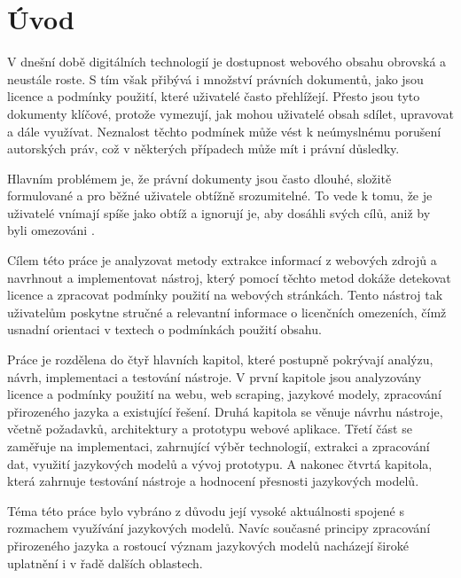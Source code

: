 \chapter*{Úvod}

V dnešní době digitálních technologií je dostupnost webového obsahu obrovská a neustále roste.
S tím však přibývá i množství právních dokumentů, jako jsou licence a podmínky použití, které uživatelé často přehlížejí.
Přesto jsou tyto dokumenty klíčové, protože vymezují, jak mohou uživatelé obsah sdílet, upravovat a dále využívat.
Neznalost těchto podmínek může vést k neúmyslnému porušení autorských práv, což v některých případech může mít i právní důsledky.

Hlavním problémem je, že právní dokumenty jsou často dlouhé, složitě formulované a pro běžné uživatele obtížně srozumitelné.
To vede k tomu, že je uživatelé vnímají spíše jako obtíž a ignorují je, aby dosáhli svých cílů, aniž by byli omezováni \cite{Obar02012020}. 

Cílem této práce je analyzovat metody extrakce informací z webových zdrojů a navrhnout a implementovat nástroj, který pomocí těchto metod dokáže detekovat licence a zpracovat podmínky použití na webových stránkách.
Tento nástroj tak uživatelům poskytne stručné a relevantní informace o licenčních omezeních, čímž usnadní orientaci v textech o podmínkách použití obsahu.

Práce je rozdělena do čtyř hlavních kapitol, které postupně pokrývají analýzu, návrh, implementaci a testování nástroje.
V první kapitole jsou analyzovány licence a podmínky použití na webu, web scraping, jazykové modely, zpracování přirozeného jazyka a existující řešení.
Druhá kapitola se věnuje návrhu nástroje, včetně požadavků, architektury a prototypu webové aplikace.
Třetí část se zaměřuje na implementaci, zahrnující výběr technologií, extrakci a zpracování dat, využití jazykových modelů a vývoj prototypu.
A nakonec čtvrtá kapitola, která zahrnuje testování nástroje a hodnocení přesnosti jazykových modelů.

Téma této práce bylo vybráno z důvodu její vysoké aktuálnosti spojené s rozmachem využívání jazykových modelů.
Navíc současné principy zpracování přirozeného jazyka a rostoucí význam jazykových modelů nacházejí široké uplatnění i v řadě dalších oblastech.
\setcounter{page}{1}

